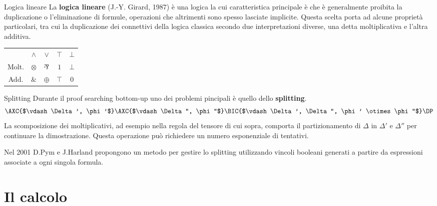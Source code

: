 \documentclass{beamer}
\newcommand{\llpar}{\rotatebox[origin=c]{180}{$\&$}}
\newcommand{\llten}{\otimes}
\newcommand{\llwith}{\&}
\newcommand{\llplus}{\oplus}
\newcommand{\llbot}{\bot}
\newcommand{\lltop}{\top}
\newcommand{\llone}{1}
\newcommand{\llzero}{0}
\begin{document}
\begin{frame}{Logica lineare}
	La \textbf{logica lineare} (J.-Y. Girard, 1987) è una logica la cui caratteristica principale è che è generalmente proibita la duplicazione o l'eliminazione di formule, operazioni che altrimenti sono spesso lasciate implicite.
	Questa scelta porta ad alcune proprietà particolari, tra cui la duplicazione dei connettivi della logica classica secondo due interpretazioni diverse, una detta moltiplicativa e l'altra additiva.
	\begin{center}
		\begin{tabular}{c|cccc|}
			\cline{2-5}
				 & $\wedge$ & $\vee$   & $\top$   & $\bot$ \\
			\cline{2-5}
			\noalign{\vskip\doublerulesep
         			\vskip-\arrayrulewidth}
			\cline{2-5}
			Molt.    & $\llten$  & $\llpar$  & $\llone$ & $\llbot$ \\
			Add.	 & $\llwith$ & $\llplus$ & $\lltop$ & $\llzero$ \\
			\cline{2-5}
		\end{tabular}
	\end{center}
\end{frame}
\begin{frame}{Splitting}
	Durante il proof searching bottom-up uno dei problemi pincipali è quello dello \textbf{splitting}.
	$$
	\AXC{$\vdash \Delta', \phi'$}
	\AXC{$\vdash \Delta'', \phi''$}
	\LeftLabel{$\llten$}
	\BIC{$\vdash \Delta', \Delta'', \phi' \llten \phi''$}
	\DP
	$$
	La scomposizione dei moltiplicativi, ad esempio nella regola del tensore di cui sopra, comporta il partizionamento di $\Delta$ in $\Delta'$ e $\Delta''$ per continuare la dimostrazione.
	Questa operazione può richiedere un numero esponenziale di tentativi.

	Nel 2001 D.Pym e J.Harland propongono un metodo per gestire lo splitting utilizzando vincoli booleani generati a partire da espressioni associate a ogni singola formula.
\end{frame}

\section{Il calcolo}

% 

% 
\end{document}
